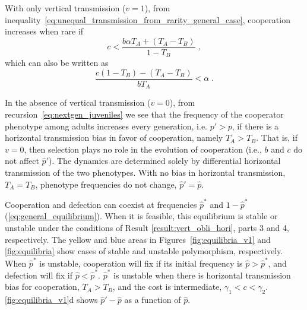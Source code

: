 \documentclass[12pt]{extarticle}
\begin{document}
With only vertical transmission ($v=1$), from inequality~\ref{eq:unequal_transmission_from_rarity_general_case}, cooperation increases when rare if
\begin{equation} \label{eq:vert_hori}
c < \frac{b \alpha T_A + (T_A - T_B)}{1-T_B} \;,
\end{equation} 
which can also be written as
\begin{equation} \label{eq:vert_hori_alpha}
\frac{c (1-T_B)-(T_A-T_B)}{b T_A} < \alpha \;.
\end{equation}

In the absence of vertical transmission ($v=0$), from recursion~\ref{eq:nextgen_juveniles} we see that the frequency of the cooperator phenotype among adults increases every generation, i.e. $p'>p$, if there is a horizontal transmission bias in favor of cooperation, namely $T_A > T_B$.  
That is, if $v=0$, then selection plays no role in the evolution of cooperation (i.e., $b$ and $c$ do not affect $\hat p'$).
The dynamics are determined solely by differential horizontal transmission of the two phenotypes.
With no bias in horizontal transmission, $T_A = T_B$, phenotype frequencies do not change, $\hat p'=\hat p$.

Cooperation and defection can coexist at frequencies $\hat{p}^*$ and $1-\hat{p}^*$ (\autoref{eq:general_equilibrium}). 
When it is feasible, this equilibrium is stable or unstable under the conditions of Result \ref{result:vert_obli_hori}, parts 3 and 4, respectively. The yellow and blue areas in Figures~\ref{fig:equilibria_v1} and \ref{fig:equilibria} show cases of stable and unstable polymorphism, respectively.
When $\hat{p}^*$ is unstable, cooperation will fix if its initial frequency is $\hat{p}>\hat{p}^*$, and defection will fix if $\hat{p}<\hat{p}^*$.
$\hat{p}^*$ is unstable when there is horizontal transmission bias for cooperation, $T_A>T_B$, and the cost is intermediate, $\gamma_1 < c < \gamma_2$.
\autoref{fig:equilibria_v1}d shows $\hat{p}'-\hat{p}$ as a function of $\hat{p}$.
\end{document}
